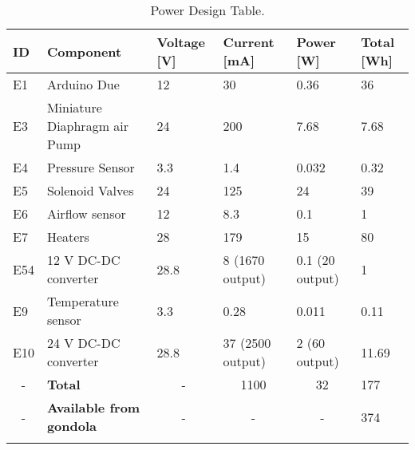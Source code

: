

\begin{longtable}{|m{}| m{} |m{} |m{}|m{}| m{} |}
\hline
\textbf{ID}             & \textbf{Component}                                                   & \textbf{Voltage {[}V{]}} & \textbf{Current {[}mA{]}} & \textbf{Power {[}W{]}} & \textbf{Total {[}Wh{]}} \\ \hline
E1 & Arduino Due & 12& 30  & 0.36  & 36  \\ \hline
E3 & Miniature Diaphragm air Pump & 24 & 200 & 7.68 & 7.68 \\ \hline
E4  & Pressure Sensor  & 3.3 & 1.4 & 0.032 & 0.32  \\ \hline
E5  & Solenoid Valves & 24 & 125 & 24  & 39 \\ \hline
E6 & Airflow sensor & 12  & 8.3   & 0.1 & 1 \\ \hline

E7   &  Heaters & 28 & 179  & 15 & 80 \\ \hline
E54  & 12 V DC-DC converter  & 28.8   & 8 (1670 output) & 0.1 (20 output) & 1 \\ \hline
E9  & Temperature sensor & 3.3 & 0.28 & 0.011  & 0.11   \\ \hline




E10  & 24 V DC-DC converter   & 28.8   & 37 (2500 output) & 2 (60 output) & 11.69 \\ \hline
\multicolumn{1}{|c|}{-} & \textbf{Total}                                  & \multicolumn{1}{c|}{-}                      & \multicolumn{1}{c|}{1100}                    & \multicolumn{1}{c|}{32}                 & 177                                        \\ \hline
\multicolumn{1}{|c|}{-} & \textbf{Available from gondola}                 & \multicolumn{1}{c|}{-}                      & \multicolumn{1}{c|}{-}                       & \multicolumn{1}{c|}{-}                    & 374                                        \\ \hline

\caption{Power Design Table.}
\label{tab:power-design-table}
\end{longtable}
\raggedbottom

